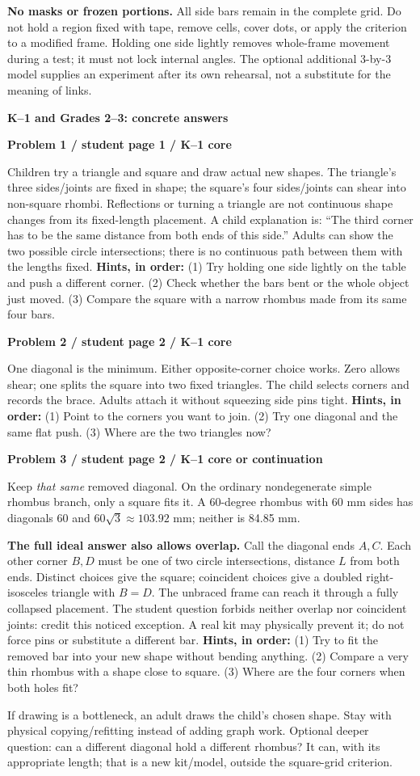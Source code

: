 \documentclass[letterpaper,11pt]{article}
\newcommand{\titleline}[1]{\par{\large\bfseries #1}\par}
\newcommand{\sub}[1]{\par\textbf{#1}\par}
\newcommand{\task}[3]{\sub{Problem #1 / student page #2 / #3}}
\newcommand{\hints}[3]{\textbf{Hints, in order:} (1) #1 (2) #2 (3) #3\par}
\begin{document}
\textbf{No masks or frozen portions.} All side bars remain in the complete grid. Do not hold a region fixed with tape, remove cells, cover dots, or apply the criterion to a modified frame. Holding one side lightly removes whole-frame movement during a test; it must not lock internal angles. The optional additional 3-by-3 model supplies an experiment after its own rehearsal, not a substitute for the meaning of links.

\newpage
\titleline{K--1 and Grades 2--3: concrete answers}
\task{1}{1}{K--1 core}
Children try a triangle and square and draw actual new shapes. The triangle's three sides/joints are fixed in shape; the square's four sides/joints can shear into non-square rhombi. Reflections or turning a triangle are not continuous shape changes from its fixed-length placement. A child explanation is: ``The third corner has to be the same distance from both ends of this side.'' Adults can show the two possible circle intersections; there is no continuous path between them with the lengths fixed.
\hints{Try holding one side lightly on the table and push a different corner.}{Check whether the bars bent or the whole object just moved.}{Compare the square with a narrow rhombus made from its same four bars.}

\task{2}{2}{K--1 core}
One diagonal is the minimum. Either opposite-corner choice works. Zero allows shear; one splits the square into two fixed triangles. The child selects corners and records the brace. Adults attach it without squeezing side pins tight.
\hints{Point to the corners you want to join.}{Try one diagonal and the same flat push.}{Where are the two triangles now?}

\task{3}{2}{K--1 core or continuation}
Keep \emph{that same} removed diagonal. On the ordinary nondegenerate simple rhombus branch, only a square fits it. A 60-degree rhombus with 60 mm sides has diagonals 60 and $60\sqrt3\approx103.92$ mm; neither is 84.85 mm.

\textbf{The full ideal answer also allows overlap.} Call the diagonal ends $A,C$. Each other corner $B,D$ must be one of two circle intersections, distance $L$ from both ends. Distinct choices give the square; coincident choices give a doubled right-isosceles triangle with $B=D$. The unbraced frame can reach it through a fully collapsed placement. The student question forbids neither overlap nor coincident joints: credit this noticed exception. A real kit may physically prevent it; do not force pins or substitute a different bar.
\hints{Try to fit the removed bar into your new shape without bending anything.}{Compare a very thin rhombus with a shape close to square.}{Where are the four corners when both holes fit?}
If drawing is a bottleneck, an adult draws the child's chosen shape. Stay with physical copying/refitting instead of adding graph work. Optional deeper question: can a different diagonal hold a different rhombus? It can, with its appropriate length; that is a new kit/model, outside the square-grid criterion.
\end{document}
